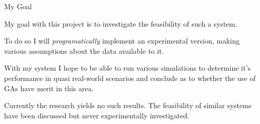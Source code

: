 \documentclass{beamer}
\begin{document}
\begin{frame}{My Goal}


    My goal with this project is to investigate the feasibility of such a system. 

    To do so I will \textit{programatically} implement an experimental version, making various assumptions about the data available to it.

    With my system I hope to be able to run various simulations to determine it's performance in quasi real-world scenarios and conclude as to whether the use of GAs have merit in this area. 

    Currently the research yields no such results. The feasibility of similar systems have been discussed\cite{kalaOnroadIntelligentVehicles2016} but never experimentally investigated.
    
\end{frame}
\end{document}

